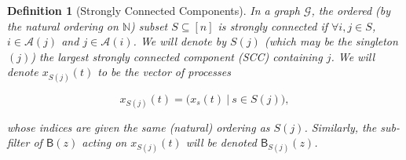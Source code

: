 \documentclass{statsoc}
\def\gcg{\mathcal{G}}  %
\def\B{\mathsf{B}}  %
\newcommand{\anc}[1]{\mathcal{A}(#1)}  %
\newtheorem{definition}{Definition}
\def\N{\mathbb{N}}  %
\begin{document}
\begin{definition}[Strongly Connected Components]
  \label{def:scc}
  In a graph $\gcg$, the \textit{ordered} (by the natural ordering on
  $\N$) subset $S \subseteq [n]$ is \textit{strongly connected} if
  $\forall i, j \in S$, $i \in \anc{j}$ and $j \in \anc{i}$.  We will
  denote by $S(j)$ (which may be the singleton $(j)$) the largest
  strongly connected component (SCC) containing $j$.  We will denote
  $x_{S(j)}(t)$ to be the vector of processes

  \[
    x_{S(j)}(t) = \big(x_s(t)\ |\ s \in S(j)\big),
  \]

  whose indices are given the same (natural) ordering as $S(j)$.
  Similarly, the sub-filter of $\B(z)$ acting on $x_{S(j)}(t)$ will be
  denoted $\B_{S(j)}(z)$.
\end{definition}
\end{document}
